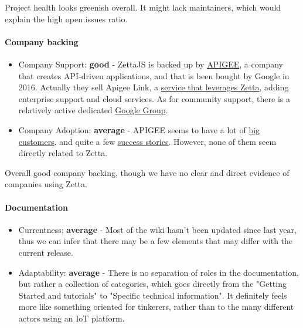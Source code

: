 \documentclass{article}
\begin{document}
Project health looks greenish overall. It might lack maintainers, which would explain the high open issues ratio.

\paragraph{Company backing}

\begin{itemize}
\item Company Support: \textbf{good} - ZettaJS is backed up by \href{https://apigee.com/}{APIGEE}, a company that creates API-driven applications, and that is been bought by Google in 2016. Actually they sell Apigee Link, a \href{https://apigee.com/about/press-release/apigee-launches-apigee-link-\%E2\%80\%9Capi-first\%E2\%80\%9D-internet-things-iot-product}{service that leverages Zetta}, adding enterprise support and cloud services. As for community support, there is a relatively active dedicated \href{https://groups.google.com/forum/#!forum/zetta-discuss}{Google Group}.
\item Company Adoption: \textbf{average} - APIGEE seems to have a lot of \href{https://apigee.com/api-management/#/customers}{big customers}, and quite a few \href{https://apigee.com/api-management/#/resources?sorting=DESC&contentType=customer_story}{success stories}. However, none of them seem directly related to Zetta.
\end{itemize}

Overall good company backing, though we have no clear and direct evidence of companies using Zetta.

\paragraph{Documentation}

\begin{itemize}
\item Currentness: \textbf{average} - Most of the wiki hasn't been updated since last year, thus we can infer that there may be a few elements that may differ with the current release.
\item Adaptability: \textbf{average} -  There is no separation of roles in the documentation, but rather a collection of categories, which goes directly from the "Getting Started and tutorials" to "Specific technical information". It definitely feels more like something oriented for tinkerers, rather than to the many different actors using an IoT platform.
\end{itemize}
\end{document}
